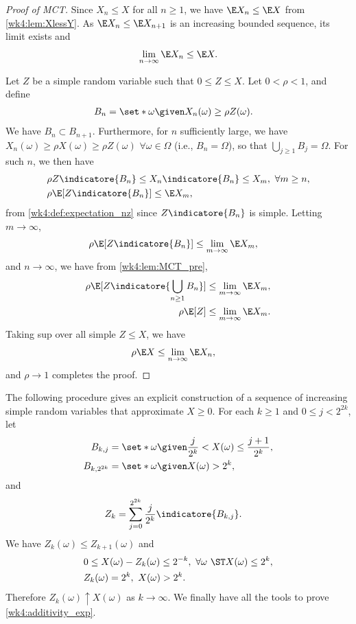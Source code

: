 \documentclass[../aipt.tex]{subfiles}
\begin{document}
\begin{proof}[Proof of MCT]
Since $X_n\leq X$ for all $n\geq1$, we have $\E X_n \leq \E X$ from \cref{wk4:lem:XlessY}. As $\E X_n \leq \E X_{n+1}$ is an increasing bounded sequence, its limit exists and
\begin{align*}
\lim_{n\to\infty} \E X_n \leq \E X.
\end{align*}

Let $Z$ be a simple random variable such that $0\leq Z\leq X$. Let $0<\rho<1$, and define
\begin{align*}
B_n&=\set*{\omega \given X_n(\omega)\geq \rho Z(\omega)}.
\end{align*}
We have $B_n \subset B_{n+1}$. Furthermore, for $n$ sufficiently large, we have $X_{n}(\omega)\geq \rho X(\omega) \geq \rho Z(\omega)$ $\forall \omega\in\Omega$ (i.e., $B_n=\Omega$), so that $\bigcup_{j\geq1} B_j = \Omega$.  For such $n$, we then have
\begin{align*}
&\rho Z \indicatore{B_{n}} \leq X_n \indicatore{B_{n}} \leq X_m,\ \forall m\geq n,\\
& \rho \E[Z\indicatore{B_{n}}] \leq \E X_m,
\end{align*}
from \cref{wk4:def:expectation_nz} since $Z\indicatore{B_{n}}$ is simple. Letting $m\to \infty$,
\begin{align*}
&\rho \E [Z \indicatore{B_{n}}] \leq \lim_{m \to \infty}\E X_m,
\end{align*}
and $n \to \infty$, we have from \cref{wk4:lem:MCT_pre},
\begin{align*}
\rho \E [Z\indicatore{\bigcup_{n\geq1} B_n}]&\leq \lim_{m \to \infty}\E X_m,\\
\rho \E [Z] &\leq \lim_{m \to \infty}\E X_m.
\end{align*}
Taking sup over all simple $Z \leq X$, we have
\begin{align*}
& \rho \E X \leq \lim_{n \to \infty}\E X_n,
\end{align*}
and $\rho \to 1$ completes the proof.
\end{proof}

The following procedure gives an explicit construction of a sequence of increasing simple random variables that approximate $X \geq 0$. For each $k\geq 1$ and $0 \leq j <2^{2k}$, let
\begin{align*}
B_{k,j} &=\set*{\omega \given \frac{j}{2^k}<X(\omega)\leq \frac{j+1}{2^k}},\\
B_{k,2^{2k}} &=\set*{\omega \given X(\omega)>2^k},
\end{align*}
and
\begin{align*}
Z_k &=\sum_{j=0}^{2^{2k}}{\frac{j}{2^k}\indicatore{B_{k,j}}}.
\end{align*}
We have $Z_k(\omega) \leq Z_{k+1}(\omega)$ and 
\begin{align*}
& 0 \leq X(\omega)-Z_k(\omega)\leq 2^{-k},\ \forall \omega\ \ST X(\omega)\leq 2^{k}, \\
& Z_k(\omega)=2^k, \ X(\omega) > 2^k.
\end{align*}
Therefore $Z_k(\omega)\uparrow X(\omega)$ as $k\to\infty$. We finally have all the tools to prove \cref{wk4:additivity_exp}.
\end{document}
